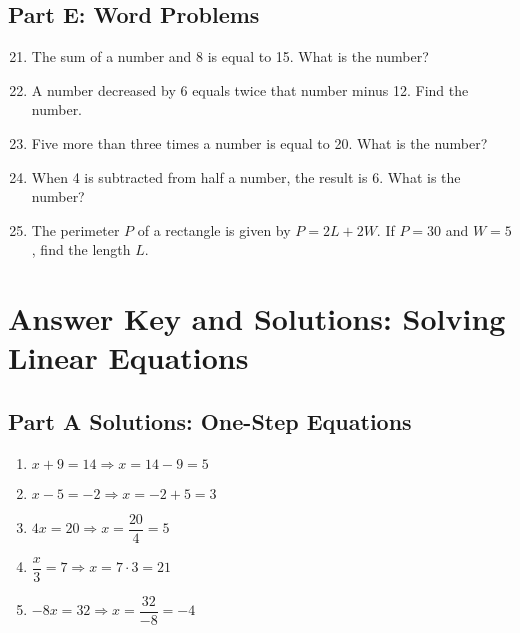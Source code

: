 \documentclass[14pt]{extarticle}
\begin{document}
\subsection*{Part E: Word Problems}
\begin{enumerate}
    \setcounter{enumi}{20}
    \item The sum of a number and 8 is equal to 15. What is the number?
    \item A number decreased by 6 equals twice that number minus 12. Find the number.
    \item Five more than three times a number is equal to 20. What is the number?
    \item When 4 is subtracted from half a number, the result is 6. What is the number?
    \item The perimeter \(P\) of a rectangle is given by \(P = 2L + 2W\). If \(P = 30\) and \(W = 5\), find the length \(L\).
\end{enumerate}

\newpage


\section*{Answer Key and Solutions: Solving Linear Equations}

\subsection*{Part A Solutions: One-Step Equations}
\begin{enumerate}
    \item \(x + 9 = 14 \Rightarrow x = 14 - 9 = \boxed{5}\)
    \item \(x - 5 = -2 \Rightarrow x = -2 + 5 = \boxed{3}\)
    \item \(4x = 20 \Rightarrow x = \dfrac{20}{4} = \boxed{5}\)
    \item \(\dfrac{x}{3} = 7 \Rightarrow x = 7 \cdot 3 = \boxed{21}\)
    \item \(-8x = 32 \Rightarrow x = \dfrac{32}{-8} = \boxed{-4}\)
\end{enumerate}
\end{document}
